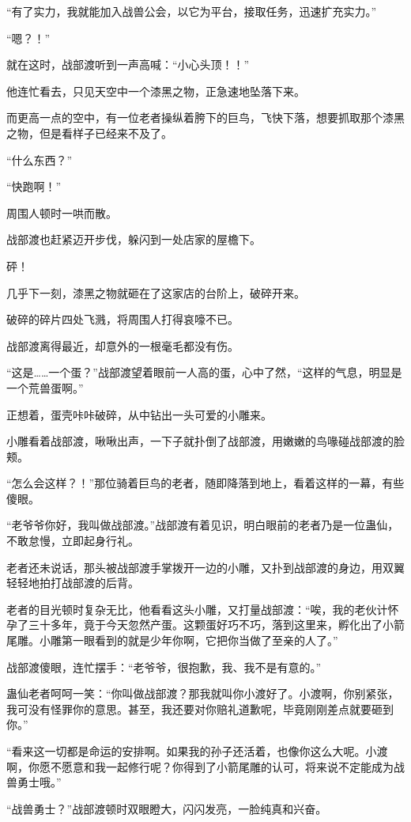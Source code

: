 \begin{this_body}
“有了实力，我就能加入战兽公会，以它为平台，接取任务，迅速扩充实力。”

“嗯？！”

就在这时，战部渡听到一声高喊：“小心头顶！！”

他连忙看去，只见天空中一个漆黑之物，正急速地坠落下来。

而更高一点的空中，有一位老者操纵着胯下的巨鸟，飞快下落，想要抓取那个漆黑之物，但是看样子已经来不及了。

“什么东西？”

“快跑啊！”

周围人顿时一哄而散。

战部渡也赶紧迈开步伐，躲闪到一处店家的屋檐下。

砰！

几乎下一刻，漆黑之物就砸在了这家店的台阶上，破碎开来。

破碎的碎片四处飞溅，将周围人打得哀嚎不已。

战部渡离得最近，却意外的一根毫毛都没有伤。

“这是……一个蛋？”战部渡望着眼前一人高的蛋，心中了然，“这样的气息，明显是一个荒兽蛋啊。”

正想着，蛋壳咔咔破碎，从中钻出一头可爱的小雕来。

小雕看着战部渡，啾啾出声，一下子就扑倒了战部渡，用嫩嫩的鸟喙碰战部渡的脸颊。

“怎么会这样？！”那位骑着巨鸟的老者，随即降落到地上，看着这样的一幕，有些傻眼。

“老爷爷你好，我叫做战部渡。”战部渡有着见识，明白眼前的老者乃是一位蛊仙，不敢怠慢，立即起身行礼。

老者还未说话，那头被战部渡手掌拨开一边的小雕，又扑到战部渡的身边，用双翼轻轻地拍打战部渡的后背。

老者的目光顿时复杂无比，他看看这头小雕，又打量战部渡：“唉，我的老伙计怀孕了三十多年，竟于今天忽然产蛋。这颗蛋好巧不巧，落到这里来，孵化出了小箭尾雕。小雕第一眼看到的就是少年你啊，它把你当做了至亲的人了。”

战部渡傻眼，连忙摆手：“老爷爷，很抱歉，我、我不是有意的。”

蛊仙老者呵呵一笑：“你叫做战部渡？那我就叫你小渡好了。小渡啊，你别紧张，我可没有怪罪你的意思。甚至，我还要对你赔礼道歉呢，毕竟刚刚差点就要砸到你。”

“看来这一切都是命运的安排啊。如果我的孙子还活着，也像你这么大呢。小渡啊，你愿不愿意和我一起修行呢？你得到了小箭尾雕的认可，将来说不定能成为战兽勇士哦。”

“战兽勇士？”战部渡顿时双眼瞪大，闪闪发亮，一脸纯真和兴奋。


\end{this_body}
